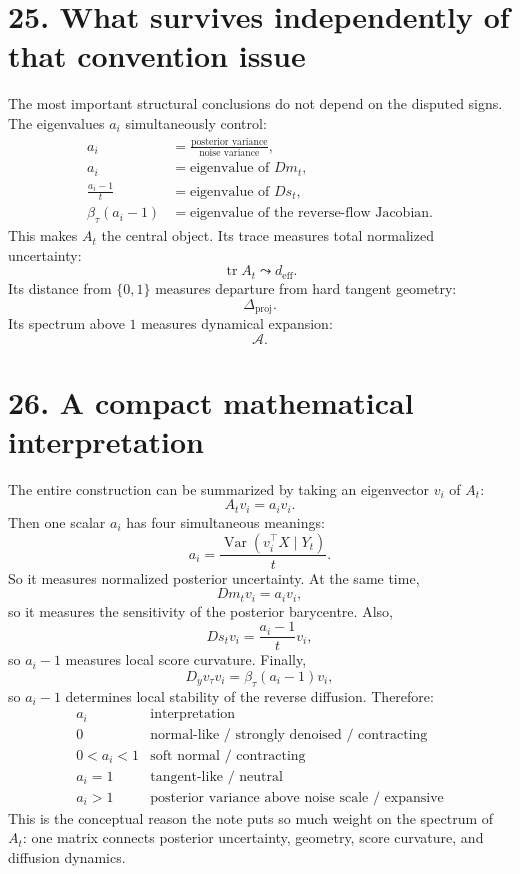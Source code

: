 \documentclass{article}
\begin{document}
\section*{25. What survives independently of that convention issue}
The most important structural conclusions do not depend on the disputed signs.
The eigenvalues $a_i$ simultaneously control:
\[
\boxed{
\begin{aligned}
a_i &= \frac{\text{posterior variance}}{\text{noise variance}},\\[2mm]
a_i &= \text{eigenvalue of }Dm_t,\\[2mm]
\frac{a_i-1}{t} &= \text{eigenvalue of }Ds_t,\\[2mm]
\beta_\tau(a_i-1) &= \text{eigenvalue of the reverse-flow Jacobian}.
\end{aligned}
}
\]
This makes $A_t$ the central object.
Its trace measures total normalized uncertainty:
\[
\operatorname{tr}A_t \leadsto d_{\mathrm{eff}}.
\]
Its distance from $\{0,1\}$ measures departure from hard tangent geometry:
\[
\Delta_{\mathrm{proj}}.
\]
Its spectrum above $1$ measures dynamical expansion:
\[
\mathcal A.
\]

\section*{26. A compact mathematical interpretation}
The entire construction can be summarized by taking an eigenvector $v_i$ of $A_t$:
\[
A_t v_i = a_i v_i.
\]
Then one scalar $a_i$ has four simultaneous meanings:
\[
\boxed{
a_i = \frac{\operatorname{Var}(v_i^\top X\mid Y_t)}{t}.
}
\]
So it measures normalized posterior uncertainty.
At the same time,
\[
Dm_t v_i = a_i v_i,
\]
so it measures the sensitivity of the posterior barycentre.
Also,
\[
Ds_t v_i = \frac{a_i-1}{t}v_i,
\]
so $a_i-1$ measures local score curvature.
Finally,
\[
D_y v_\tau v_i = \beta_\tau(a_i-1)v_i,
\]
so $a_i-1$ determines local stability of the reverse diffusion.
Therefore:
\[
\boxed{
\begin{array}{c|c}
a_i & \text{interpretation}\\
\hline
0 & \text{normal-like / strongly denoised / contracting}\\
0<a_i<1 & \text{soft normal / contracting}\\
a_i=1 & \text{tangent-like / neutral}\\
a_i>1 & \text{posterior variance above noise scale / expansive}
\end{array}
}
\]
This is the conceptual reason the note puts so much weight on the spectrum of $A_t$: one matrix connects posterior uncertainty, geometry, score curvature, and diffusion dynamics.
\end{document}
